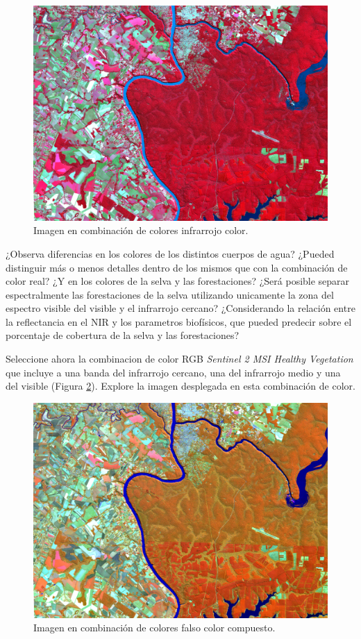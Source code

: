 \documentclass[a4paper,12pt]{book}
\begin{document}
\begin{figure}[h]
    \centering
    \includegraphics{fig:NRG.png}
    \caption{Imagen en combinación de colores infrarrojo color.}
    \label{fig:NRG}
\end{figure}

\begin{que}
    ¿Observa diferencias en los colores de los distintos cuerpos de agua? ¿Pueded distinguir más o menos detalles dentro de los mismos que con la combinación de color real? ¿Y en los colores de la selva y las forestaciones? ¿Será posible separar espectralmente las forestaciones de la selva utilizando unicamente la zona del espectro visible del visible y el infrarrojo cercano? ¿Considerando la relación entre la reflectancia en el NIR y los parametros biofísicos, que pueded predecir sobre el porcentaje de cobertura de la selva y las forestaciones?
\end{que}

Seleccione ahora la combinacion de color RGB \emph{Sentinel 2 MSI Healthy Vegetation} que incluye a una banda del infrarrojo cercano, una del infrarrojo medio y una del visible (Figura \ref{fig:SNR}). Explore la imagen desplegada en esta combinación de color.

\begin{figure}[h]
    \centering
    \includegraphics{fig:SNR.png}
    \caption{Imagen en combinación de colores falso color compuesto.}
    \label{fig:SNR}
\end{figure}
\end{document}
